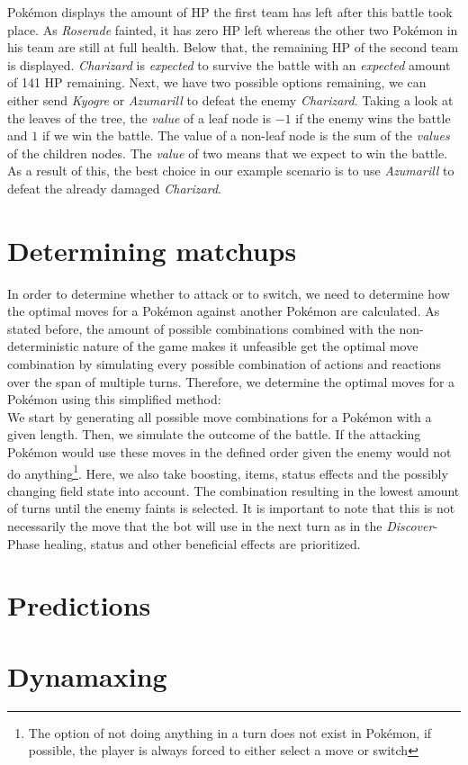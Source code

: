 Pokémon displays the amount of \ac{HP} the first team has left after this battle took place. As \textit{Roserade} fainted,
it has zero \ac{HP} left whereas the other two Pokémon in his team are still at full health. Below that, the remaining 
\ac{HP} of the second team is displayed. \textit{Charizard} is \textit{expected} to survive the battle with an 
\textit{expected} amount of 141 \ac{HP} remaining. Next, we have two possible options remaining, we can either send
\textit{Kyogre} or \textit{Azumarill} to defeat the enemy \textit{Charizard}. Taking a look at the leaves of the tree,
the \textit{value} of a leaf node is $-1$ if the enemy wins the battle and $1$ if we win the battle. 
The value of a non-leaf node is the sum of the \textit{values} of the children nodes. The \textit{value} of two means that we 
expect to win the battle. As a result of this, the best choice in our example scenario is to use \textit{Azumarill} to 
defeat the already damaged \textit{Charizard}. \\

\section{Determining matchups}
\label{sec:determine-matchups}
In order to determine whether to attack or to switch, we need to determine how the optimal moves for a Pokémon against
another Pokémon are calculated. As stated before, the amount of possible combinations combined with the non-deterministic
nature of the game makes it unfeasible get the optimal move combination by simulating every possible combination of 
actions and reactions over the span of multiple turns. Therefore, we determine the optimal moves for a Pokémon using 
this simplified method: \\
We start by generating all possible move combinations for a Pokémon with a given length. Then, we simulate the outcome
of the battle. If the attacking Pokémon would use these moves in the defined order given the enemy would not do 
anything\footnote{The option of not doing anything in a turn does not exist in Pokémon, if possible, the player is always 
forced to either select a move or switch}. Here, we also take boosting, items, status effects and the possibly changing
field state into account.
The combination resulting in the lowest amount of turns until the enemy faints is selected. 
It is important to note that this is not necessarily the move that the bot will use in the next turn as in the 
\textit{Discover}-Phase healing, status and other beneficial effects are prioritized.

\section{Predictions}
\label{sec:predictions}

\section{Dynamaxing}
\label{sec:dynamaxing}
